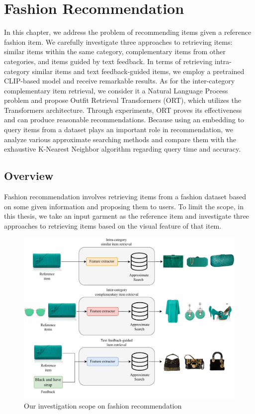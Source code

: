 \chapter{Fashion Recommendation}
\label{chapter-fashion-recommendation}
\begin{ChapAbstract}
In this chapter, we address the problem of recommending items given a reference fashion item. We carefully investigate three approaches to retrieving items: similar items within the same category, complementary items from other categories, and items guided by text feedback. 
In terms of retrieving intra-category similar items and text feedback-guided items, we employ a pretrained CLIP-based model and receive remarkable results. As for the inter-category complementary item retrieval, we consider it a Natural Language Process problem and propose Outfit Retrieval Transformers (ORT), which utilizes the Transformers architecture. Through experiments, ORT proves its effectiveness and can produce reasonable recommendations. Because using an embedding to query items from a dataset plays an important role in recommendation, we analyze various approximate searching methods and compare them with the exhaustive K-Nearest Neighbor algorithm regarding query time and accuracy.
\end{ChapAbstract}

\section{Overview}
Fashion recommendation involves retrieving items from a fashion dataset based on some given information and proposing them to users. To limit the scope, in this thesis, we take an input garment as the reference item and investigate three approaches to retrieving items based on the visual feature of that item. 

\begin{figure}[t!]
    \centering
    \includegraphics[width=\linewidth]{content/resources/images/fashion-recommendation/chapter4-overview.pdf}
    \caption{Our investigation scope on fashion recommendation}
    \label{fig:chapter4-overview}
\end{figure}

